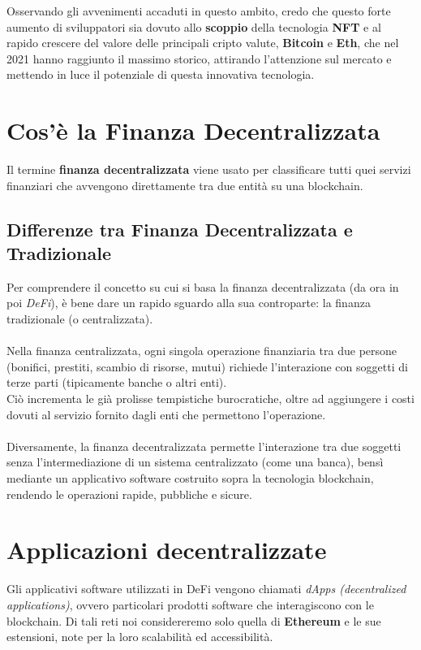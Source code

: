 \documentclass[12pt,a4paper]{report}
\begin{document}
\noindent Osservando gli avvenimenti accaduti in questo ambito, credo che questo forte aumento di sviluppatori sia dovuto allo \textbf{scoppio} della tecnologia \textbf{NFT} e al rapido crescere del valore delle principali cripto valute, \textbf{Bitcoin} e \textbf{Eth}, che nel 2021 hanno raggiunto il massimo storico, attirando l'attenzione sul mercato e mettendo in luce il potenziale di questa innovativa tecnologia.

\section{Cos'è la Finanza Decentralizzata}

Il termine \textbf{finanza decentralizzata} viene usato per classificare tutti quei servizi finanziari che avvengono direttamente tra due entità su una blockchain.

\subsection{Differenze tra Finanza Decentralizzata e Tradizionale}

Per comprendere il concetto su cui si basa la finanza decentralizzata (da ora in poi \textit{DeFi}), è bene dare un rapido sguardo alla sua controparte: la finanza tradizionale (o centralizzata).\\\\
Nella finanza centralizzata, ogni singola operazione finanziaria tra due persone (bonifici, prestiti, scambio di risorse, mutui) richiede l'interazione con soggetti di terze parti (tipicamente banche o altri enti).\\
Ciò incrementa le già prolisse tempistiche burocratiche, oltre ad aggiungere i costi dovuti al servizio fornito dagli enti che permettono l'operazione.
\\\\Diversamente, la finanza decentralizzata permette l'interazione tra due soggetti senza l'intermediazione di un sistema centralizzato (come una banca), bensì mediante un applicativo software costruito sopra la tecnologia blockchain, rendendo le operazioni rapide, pubbliche e sicure.



\section{Applicazioni decentralizzate}
Gli applicativi software utilizzati in DeFi vengono chiamati \textit{dApps (decentralized applications)}, ovvero particolari prodotti software che interagiscono con le blockchain. Di tali reti noi considereremo solo quella di \textbf{Ethereum}\cite{ethereum} e le sue estensioni, note per la loro scalabilità ed accessibilità.
\end{document}
